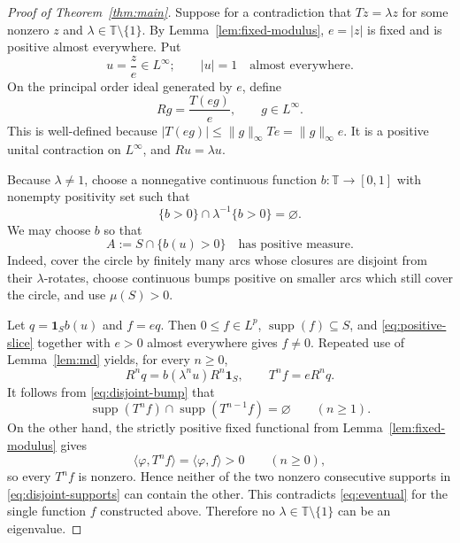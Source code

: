 \documentclass[11pt]{article}
\newcommand{\Torus}{\mathbb T}
\newcommand{\suppop}{\operatorname{supp}}
\begin{document}
\begin{proof}[Proof of Theorem~\ref{thm:main}]
Suppose for a contradiction that $Tz=\lambda z$ for some nonzero $z$ and
$\lambda\in\Torus\setminus\{1\}$.  By Lemma~\ref{lem:fixed-modulus},
$e=|z|$ is fixed and is positive almost everywhere.  Put
\[
 u=\frac{z}{e}\in L^\infty;
 \qquad |u|=1\quad\text{almost everywhere}.
\]
On the principal order ideal generated by $e$, define
\begin{equation}\label{eq:R}
 Rg=\frac{T(eg)}{e},\qquad g\in L^\infty.
\end{equation}
This is well-defined because
$|T(eg)|\le\|g\|_\infty Te=\|g\|_\infty e$.  It is a positive unital
contraction on $L^\infty$, and $Ru=\lambda u$.

Because $\lambda\ne1$, choose a nonnegative continuous function
$b:\Torus\to[0,1]$ with nonempty positivity set such that
\begin{equation}\label{eq:disjoint-bump}
 \{b>0\}\cap\lambda^{-1}\{b>0\}=\varnothing.
\end{equation}
We may choose $b$ so that
\begin{equation}\label{eq:positive-slice}
 A:=S\cap\{b(u)>0\}
 \quad\text{has positive measure}.
\end{equation}
Indeed, cover the circle by finitely many arcs whose closures are disjoint
from their $\lambda$-rotates, choose continuous bumps positive on smaller
arcs which still cover the circle, and use $\mu(S)>0$.

Let $q=\mathbf1_S b(u)$ and $f=eq$.  Then $0\le f\in L^p$,
$\suppop(f)\subseteq S$, and \eqref{eq:positive-slice} together with
$e>0$ almost everywhere gives $f\ne0$.  Repeated use of
Lemma~\ref{lem:md} yields, for every $n\ge0$,
\begin{equation}\label{eq:iterate}
 R^nq=b(\lambda^n u)R^n\mathbf1_S,
 \qquad
 T^nf=eR^nq.
\end{equation}
It follows from \eqref{eq:disjoint-bump} that
\begin{equation}\label{eq:disjoint-supports}
 \suppop(T^nf)\cap\suppop(T^{n-1}f)=\varnothing
 \qquad(n\ge1).
\end{equation}
On the other hand, the strictly positive fixed functional from
Lemma~\ref{lem:fixed-modulus} gives
\[
 \langle\varphi,T^nf\rangle=\langle\varphi,f\rangle>0
 \qquad(n\ge0),
\]
so every $T^nf$ is nonzero.  Hence neither of the two nonzero consecutive
supports in \eqref{eq:disjoint-supports} can contain the other.  This
contradicts \eqref{eq:eventual} for the single function $f$ constructed
above.  Therefore no $\lambda\in\Torus\setminus\{1\}$ can be an eigenvalue.
\end{proof}
\end{document}
